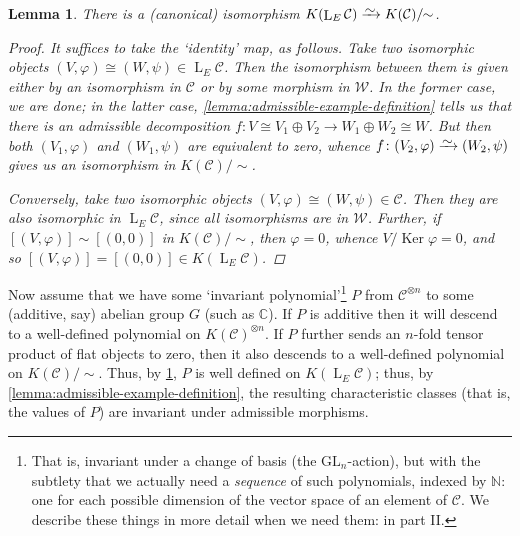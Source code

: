 \documentclass[11pt,fleqn]{article}
\theoremstyle{plain}
\newtheorem{lemma}[theorem]{Lemma}
\theoremstyle{definition}
\theoremstyle{remark}
\numberwithin{equation}{theorem}
\newcommand{\congto}{\xrightarrow{\raisebox{-.5ex}[0ex][0ex]{$\sim$}}}
\DeclareMathOperator{\Ker}{Ker}
\DeclareMathOperator{\LL}{L}
\begin{document}
        \begin{lemma}\label{lemma:admissible-example-isomorphism}
            There is a (canonical) isomorphism $K(\LL_E\mathcal{C})\congto K(\mathcal{C})/\!\!\sim$.
            \begin{proof}
                It suffices to take the `identity' map, as follows. Take two isomorphic objects $(V,\varphi)\cong(W,\psi)\in \LL_E\mathcal{C}$. 
                Then the isomorphism between them is given either by an isomorphism in $\mathcal{C}$ or by some morphism in $\mathcal{W}$.
                In the former case, we are done; in the latter case, \cref{lemma:admissible-example-definition} tells us that there is an admissible decomposition $f\colon V\cong V_1\oplus V_2\to W_1\oplus W_2\cong W$.
                But then both $(V_1,\varphi)$ and $(W_1,\psi)$ are equivalent to zero, whence $f\colon(V_2,\varphi)\congto(W_2,\psi)$ gives us an isomorphism in $K(\mathcal{C})/\!\!\sim$.

                Conversely, take two isomorphic objects $(V,\varphi)\cong(W,\psi)\in\mathcal{C}$. Then they are also isomorphic in $\LL_E\mathcal{C}$, since all isomorphisms are in $\mathcal{W}$.
                Further, if \mbox{$[(V,\varphi)]\sim[(0,0)]$} in $K(\mathcal{C})/\!\!\sim$, then $\varphi=0$, whence $V/\Ker\varphi=0$, and so $[(V,\varphi)]=[(0,0)]\in K(\LL_E\mathcal{C})$.
            \end{proof}
        \end{lemma}

        Now assume that we have some `invariant polynomial'\footnote{That is, invariant under a change of basis (the $\mathrm{GL}_n$-action), but with the subtlety that we actually need a \emph{sequence} of such polynomials, indexed by $\mathbb{N}$: one for each possible dimension of the vector space of an element of $\mathcal{C}$. We describe these things in more detail when we need them: in part II.} $P$ from $\mathcal{C}^{\otimes n}$ to some (additive, say) abelian group $G$ (such as $\mathbb{C}$).
        If $P$ is additive then it will descend to a well-defined polynomial on $K(\mathcal{C})^{\otimes n}$.
        If $P$ further sends an $n$-fold tensor product of flat objects to zero, then it also descends to a well-defined polynomial on $K(\mathcal{C})/\!\!\sim$.
        Thus, by \cref{lemma:admissible-example-isomorphism}, $P$ is well defined on $K(\LL_E\mathcal{C})$; thus, by \cref{lemma:admissible-example-definition}, the resulting characteristic classes (that is, the values of $P$) are invariant under admissible morphisms.
\end{document}
